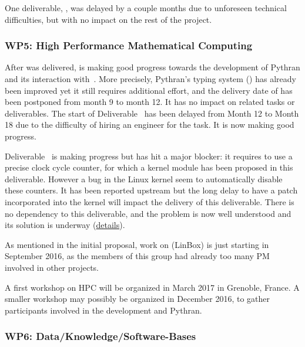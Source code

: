 \documentclass{deliverablereport}
\begin{document}
One deliverable, , was delayed by a
couple months due to unforeseen technical difficulties, but with no
impact on the rest of the project.

\subsubsection{WP5: High Performance Mathematical Computing}

After  was delivered,
 is making good progress towards the
development of Pythran and its interaction with~\Sage.  More
precisely, Pythran's typing system ()
has already been improved
yet it still requires additional effort, and the delivery date of
 has been postponed from month 9 to month
12. It has no impact on related tasks or deliverables. The start of
Deliverable~ has been delayed from Month
12 to Month 18 due to the difficulty of hiring an engineer for the
task. It is now making good progress.

Deliverable~ is making
progress but has hit a major blocker: it requires to use a precise
clock cycle counter, for which a kernel module has been proposed in
this deliverable. However a bug in the Linux kernel seem to
automatically disable these counters. It has been reported upstream
but the long delay to have a patch incorporated into the kernel will
impact the delivery of this deliverable. There is no dependency to
this deliverable, and the problem is now well understood and its
solution is underway
(\href{https://github.com/OpenDreamKit/OpenDreamKit/issues/118}{details}).

As mentioned in the initial proposal, work on
 (LinBox) is just starting in September 2016,
as the members of this group had already too many PM involved in other
projects.

A first workshop on HPC will be organized in March 2017 in Grenoble,
France. A smaller workshop may possibly be organized in December 2016,
to gather participants involved in the development and Pythran.


\subsubsection{WP6: Data/Knowledge/Software-Bases }
\end{document}
